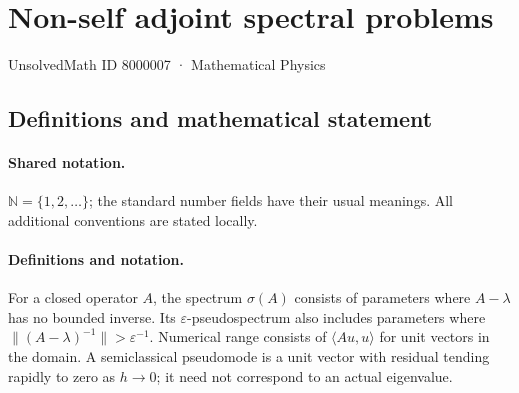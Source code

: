 \documentclass[11pt]{article}
\begin{document}
\setcounter{section}{8000006}
\section{Non-self adjoint spectral problems}\label{8000007}
{\small UnsolvedMath ID 8000007 · Mathematical Physics}
\subsection{Definitions and mathematical statement}

\paragraph{Shared notation.}$\mathbb N=\{1,2,\ldots\}$; the standard number fields have their usual meanings. All additional conventions are stated locally.


\paragraph{Definitions and notation.}For a closed operator $A$, the spectrum $\sigma(A)$ consists of parameters where $A-\lambda$ has no bounded inverse. Its $\varepsilon$-pseudospectrum also includes parameters where $\|(A-\lambda)^{-1}\|>\varepsilon^{-1}$. Numerical range consists of $\langle Au,u\rangle$ for unit vectors in the domain. A semiclassical pseudomode is a unit vector with residual tending rapidly to zero as $h\to0$; it need not correspond to an actual eigenvalue.
\end{document}
